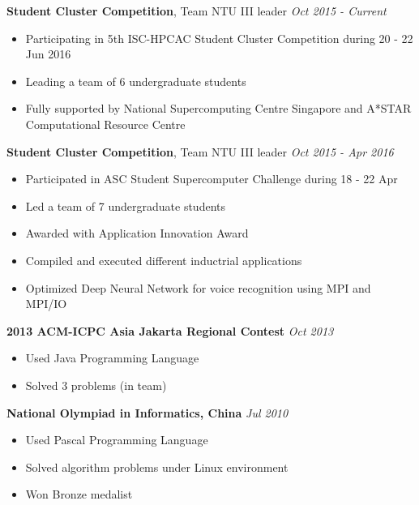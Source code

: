 \documentclass[a4paper, 12pt]{article}
\newenvironment{changemargin}[2]{%
  \begin{list}{}{%
      \setlength{\topsep}{0pt}%
      \setlength{\leftmargin}{#1}%
      \setlength{\rightmargin}{#2}%
      \setlength{\listparindent}{\parindent}%
      \setlength{\itemindent}{\parindent}%
      \setlength{\parsep}{\parskip}%
    }%
  \item[]}{\end{list}
}
\newenvironment{body}
{
\vspace*{-16pt}
\begin{changemargin}{-0.25in}{-0.5in}
}
{
\end{changemargin}
}
\begin{document}
\begin{body}
  \vspace{14pt}

  \textbf{Student Cluster Competition}, {Team NTU III leader} \hfill \emph{Oct 2015 - Current}\\
  \vspace*{-6pt}
  \begin{itemize} \itemsep -0pt  \small
  \item Participating in 5th ISC-HPCAC Student Cluster Competition during 20 - 22 Jun 2016
  \item Leading a team of 6 undergraduate students
  \item Fully supported by National Supercomputing Centre Singapore and A*STAR Computational Resource Centre
  \end{itemize}

  \textbf{Student Cluster Competition}, {Team NTU III leader} \hfill \emph{Oct 2015 - Apr 2016}\\
  \vspace*{-6pt}
  \begin{itemize} \itemsep -0pt  \small
  \item Participated in ASC Student Supercomputer Challenge during 18 - 22 Apr
  \item Led a team of 7 undergraduate students
  \item Awarded with Application Innovation Award
  \item Compiled and executed different inductrial applications
  \item Optimized Deep Neural Network for voice recognition using MPI and MPI/IO
  \end{itemize}

  \textbf{2013 ACM-ICPC Asia Jakarta Regional Contest} \hfill \emph{Oct 2013}\\
  \vspace*{-6pt}
  \begin{itemize} \itemsep -0pt  \small
  \item Used Java Programming Language
  \item Solved 3 problems (in team)
  \end{itemize}
  
  \textbf{National Olympiad in Informatics, China} \hfill \emph{Jul 2010}\\
  \vspace*{-6pt}
  \begin{itemize} \itemsep -0pt \small
  \item Used Pascal Programming Language
  \item Solved algorithm problems under Linux environment
  \item Won Bronze medalist
  \end{itemize}


\end{body}
\end{document}

